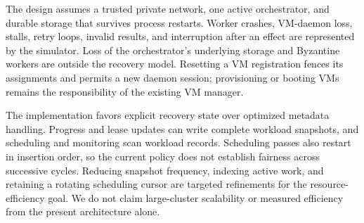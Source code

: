 The design assumes a trusted private network, one active orchestrator, and
durable storage that survives process restarts. Worker crashes, VM-daemon loss,
stalls, retry loops, invalid results, and interruption after an effect are
represented by the simulator. Loss of the orchestrator's underlying storage and
Byzantine workers are outside the recovery model. Resetting a VM registration
fences its assignments and permits a new daemon session; provisioning or booting
VMs remains the responsibility of the existing VM manager.

The implementation favors explicit recovery state over optimized metadata
handling. Progress and lease updates can write complete workload snapshots,
and scheduling and monitoring scan workload records. Scheduling passes also
restart in insertion order, so the current policy does not establish fairness
across successive cycles. Reducing snapshot frequency, indexing active work,
and retaining a rotating scheduling cursor are targeted refinements for the
resource-efficiency goal. We do not claim large-cluster scalability or measured
efficiency from the present architecture alone.
